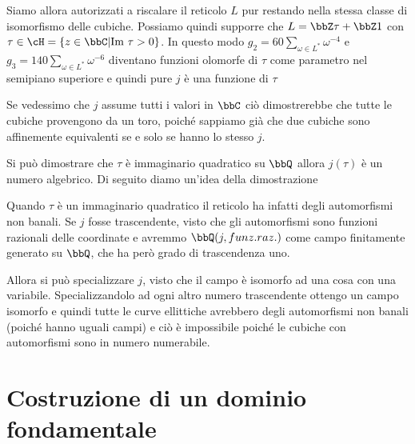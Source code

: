 Siamo allora autorizzati a riscalare il reticolo $L$ pur restando nella
stessa classe di isomorfismo delle cubiche. Possiamo quindi supporre che
$L = \bbZ \tau + \bbZ 1$ con $\tau \in \cH = \{ z \in \bbC | \Img \tau >
0 \}$. In questo modo $g_2 = 60 \sum_{\omega \in L^*} \omega^{-4}$ e
$g_3 = 140 \sum_{\omega \in L^*} \omega^{-6}$ diventano funzioni
olomorfe di $\tau$ come parametro nel semipiano superiore e quindi pure
$j$ è una funzione di $\tau$

\begin{osservazione}
  Se vedessimo che $j$ assume tutti i valori in $\bbC$ ciò dimostrerebbe
  che tutte le cubiche provengono da un toro, poiché sappiamo già che
  due cubiche sono affinemente equivalenti se e solo se hanno lo stesso $j$.
\end{osservazione}

\begin{divagazione}
  Si può dimostrare che $\tau$ è immaginario quadratico su $\bbQ$ allora
  $j(\tau)$ è un numero algebrico. Di seguito diamo un'idea della dimostrazione

  Quando $\tau$ è un immaginario quadratico il reticolo ha infatti degli
  automorfismi non banali. Se $j$ fosse trascendente, visto che gli
  automorfismi sono funzioni razionali delle coordinate e avremmo
  $\bbQ(j, funz.raz.)$ come campo finitamente generato su $\bbQ$, che ha
  però grado di trascendenza uno.

  Allora si può specializzare $j$, visto che il campo è isomorfo ad una
  cosa con una variabile. Specializzandolo ad ogni altro numero
  trascendente ottengo un campo isomorfo e quindi tutte le curve
  ellittiche avrebbero degli automorfismi non banali (poiché hanno
  uguali campi) e ciò è impossibile poiché le cubiche con automorfismi
  sono in numero numerabile.
\end{divagazione}

\section{Costruzione di un dominio fondamentale}


